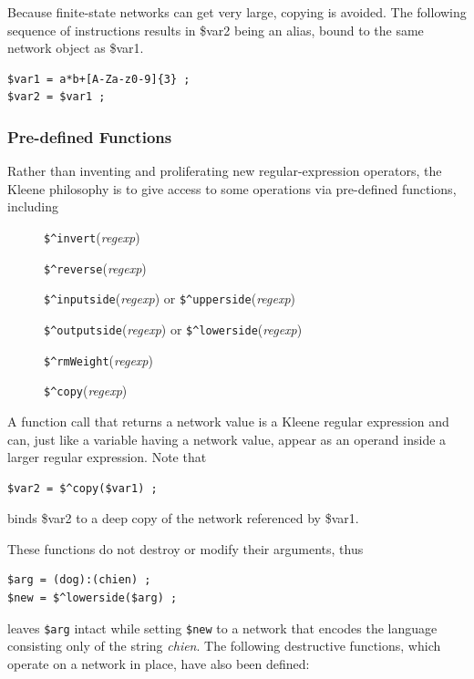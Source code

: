 \documentclass[letterpaper,12pt]{article}
\newcommand{\Kleene}{Kleene\xspace}
\begin{document}
Because finite-state networks can get very large, copying is avoided.
The following sequence of instructions results in \$var2 being an alias, bound to
the same network object as \$var1.

\begin{Verbatim}[fontsize=\small]
$var1 = a*b+[A-Za-z0-9]{3} ;
$var2 = $var1 ;
\end{Verbatim}

\subsubsection{Pre-defined Functions}

Rather than inventing and proliferating new regular-expression operators, 
the \Kleene{} philosophy is to give access to some operations via
pre-defined functions, including

\begin{description}
\item[]
\verb!$^invert!(\textit{regexp})
\item[]
\verb!$^reverse!(\textit{regexp})
\item[]
\verb!$^inputside!(\textit{regexp}) or \verb!$^upperside!(\textit{regexp}) 
\item[]
\verb!$^outputside!(\textit{regexp}) or \verb!$^lowerside!(\textit{regexp}) 
\item[]
\verb!$^rmWeight!(\textit{regexp})
\item[]
\verb!$^copy!(\textit{regexp}) 
\end{description}

\noindent
A function call that returns a network value is a \Kleene{} regular
expression and can, just like a variable having a network value,
appear as an operand inside a larger regular expression.  Note that

\begin{Verbatim}[fontsize=\small]
$var2 = $^copy($var1) ;
\end{Verbatim}

\noindent
binds \$var2 to a deep copy of the network referenced by \$var1.

These functions do not destroy or modify their arguments, thus

\begin{Verbatim}[fontsize=\small]
$arg = (dog):(chien) ;
$new = $^lowerside($arg) ;
\end{Verbatim}

\noindent
leaves \verb!$arg! intact while setting \verb!$new! to a network
that encodes the language consisting only of the string
\emph{chien}.  The following destructive functions, which operate on
a network in place, have also been
defined:
\end{document}
